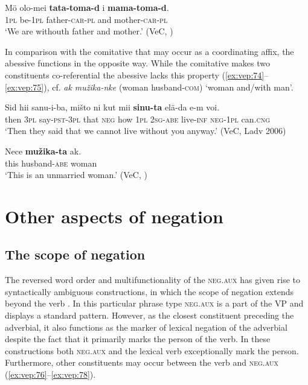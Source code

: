 \documentclass[output=paper,colorlinks=true, citecolor=brown]{langscibook}
\begin{document}
\ea\label{ex:vep:73}
    \gll  Mö olo{}-mei \textbf{tata{}-toma{}-d} i \textbf{mama{}-toma{}-d}. \\
         \textsc{1pl} be-\textsc{1pl} father-\textsc{car-pl} and mother-\textsc{car-pl}\\
    \glt ‘We are withouth father and mother.’ (VeC, \citealt[121]{MSFOu70})
\z 

In comparison with the comitative that may occur as a coordinating affix, the abessive functions in the opposite way. While the comitative makes two constituents co-referential the abessive lacks this property (\ref{ex:vep:74}–\ref{ex:vep:75}), cf. \textit{ak mužika-nke} (woman husband-\textsc{com}) ‘woman and/with man’.

\ea\label{ex:vep:74}
    \gll  Sid hii sanu{}-i{}-ba, mišto ni kut mii \textbf{sinu-ta} elä{}-da e{}-m voi.\\
         then \textsc{3pl} say-\textsc{pst-3pl} that \textsc{neg} how \textsc{1pl} \textsc{2sg-abe} live-\textsc{inf} \textsc{neg-1pl} can.\textsc{cng} \\
    \glt ‘Then they said that we cannot live without you anyway.’ (VeC, Ladv 2006)
\z 

\ea\label{ex:vep:75}
    \gll Nece \textbf{mužika{}-ta} ak. \\
         this husband-\textsc{abe} woman\\
    \glt ‘This is an unmarried woman.’ (VeC, \citealt[354]{MSFOu86})
\z

\section{Other aspects of negation}\label{sec:vep:4}
\subsection{The scope of negation}\label{sec:vep:4.1}

The reversed word order and multifunctionality of the \textsc{neg}.\textsc{aux} has given rise to syntactically ambiguous constructions, in which the scope of negation extends beyond the verb \citep[cf.][437--439]{MSFOu86}.  In this particular phrase type \textsc{neg}.\textsc{aux} is a part of the VP and displays a standard pattern. However, as the closest constituent preceding the adverbial, it also functions as the marker of lexical negation of the adverbial despite the fact that it primarily marks the person of the verb. In these constructions both \textsc{neg.aux} and the lexical verb exceptionally mark the person. Furthermore, other constituents may occur between the verb and \textsc{neg}.\textsc{aux} (\ref{ex:vep:76}–\ref{ex:vep:78}).
\end{document}
